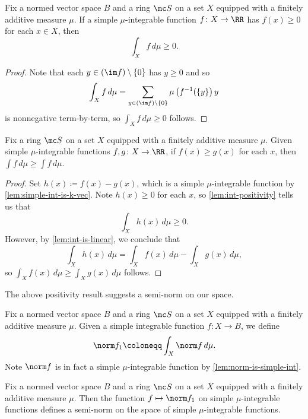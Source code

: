 \documentclass[../notes.tex]{subfiles}
\begin{document}
\begin{lemma} \label{lem:int-positivity}
	Fix a normed vector space $B$ and a ring $\mc S$ on a set $X$ equipped with a finitely additive measure $\mu$. If a simple $\mu$-integrable function $f\colon X\to\RR$ has $f(x)\ge0$ for each $x\in X$, then
	\[\int_Xf\,d\mu\ge0.\]
\end{lemma}
\begin{proof}
	Note that each $y\in(\im f)\setminus\{0\}$ has $y\ge0$ and so
	\[\int_Xf\,d\mu=\sum_{y\in(\im f)\setminus\{0\}}\mu\left(f^{-1}(\{y\}\right)y\]
	is nonnegative term-by-term, so $\int_Xf\,d\mu\ge0$ follows.
\end{proof}
\begin{cor} \label{cor:bound-ints}
	Fix a ring $\mc S$ on a set $X$ equipped with a finitely additive measure $\mu$. Given simple $\mu$-integrable functions $f,g\colon X\to\RR$, if $f(x)\ge g(x)$ for each $x$, then $\int f\,d\mu\ge\int f\,d\mu$.
\end{cor}
\begin{proof}
	Set $h(x)\coloneqq f(x)-g(x)$, which is a simple $\mu$-integrable function by \autoref{lem:simple-int-is-k-vec}. Note $h(x)\ge0$ for each $x$, so \autoref{lem:int-positivity} tells us that
	\[\int_Xh(x)\,d\mu\ge0.\]
	However, by \autoref{lem:int-is-linear}, we conclude that
	\[\int_Xh(x)\,d\mu=\int_Xf(x)\,d\mu-\int_Xg(x)\,d\mu,\]
	so $\int_Xf(x)\,d\mu\ge\int_Xg(x)\,d\mu$ follows.
\end{proof}
The above positivity result suggests a semi-norm on our space.
\begin{notation}
	Fix a normed vector space $B$ and a ring $\mc S$ on a set $X$ equipped with a finitely additive measure $\mu$. Given a simple integrable function $f\colon X\to B$, we define
	\[\norm f_1\coloneqq\int_X\norm f\,d\mu.\]
	Note $\norm f$ is in fact a simple $\mu$-integrable function by \autoref{lem:norm-is-simple-int}.
\end{notation}
\begin{lemma}
	Fix a normed vector space $B$ and a ring $\mc S$ on a set $X$ equipped with a finitely additive measure $\mu$. Then the function $f\mapsto\norm f_1$ on simple $\mu$-integrable functions defines a semi-norm on the space of simple $\mu$-integrable functions.
\end{lemma}
\end{document}

